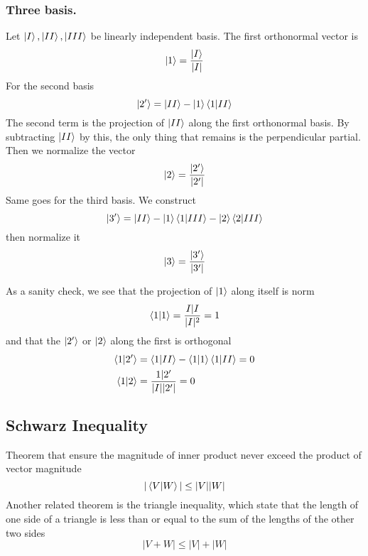 \documentclass[../main.tex]{subfiles}
\begin{document}
\subsubsection*{Three basis.}
Let $\ket{I}, \ket{II}, \ket{III}$ be linearly independent basis.
The first orthonormal vector is
\begin{equation*}
	\ket{1}=\frac{\ket{I}}{|I|}
\end{equation*}
For the second basis
\begin{equation*}
	\ket{2'}=\ket{II}-\ket{1}\braket{1|II}
\end{equation*}
The second term is the projection of $\ket{II}$ along the first orthonormal basis.
By subtracting $\ket{II}$ by this, the only thing that remains is the perpendicular partial.
Then we normalize the vector
\begin{equation*}
	\ket{2}=\frac{\ket{2'}}{|2'|}
\end{equation*}
Same goes for the third basis.
We construct
\begin{equation*}
	\ket{3'} =\ket{II}-\ket{1}\braket{1|III}-\ket{2}\braket{2|III}
\end{equation*}
then normalize it
\begin{equation*}
	\ket{3}=\frac{\ket{3'}}{|3'|}
\end{equation*}

As a sanity check, we see that the projection of $\ket{1}$ along itself is norm
\begin{equation*}
	\braket{1|1}=\frac{I|I }{|I|^2}=1
\end{equation*}
and that the $\ket{2'}$ or $\ket{2}$ along the first is orthogonal
\begin{align*}
	\braket{1|2'} & =\braket{1|II}-\braket{1|1}\braket{1|II}=0 \\
	\braket{1|2}  & =\frac{1|2'}{|I||2'|}=0
\end{align*}

\subsection*{Schwarz Inequality}
Theorem that ensure the magnitude of inner product never exceed the product of vector magnitude
\begin{equation*}
	|\braket{V|W}|\leq|V||W|
\end{equation*}
Another related theorem is the triangle inequality, which state that the length of one side of a triangle is less than or equal to the sum of the lengths of the other two sides
\begin{equation*}
	|V+W|\leq|V|+|W|
\end{equation*}
\end{document}

